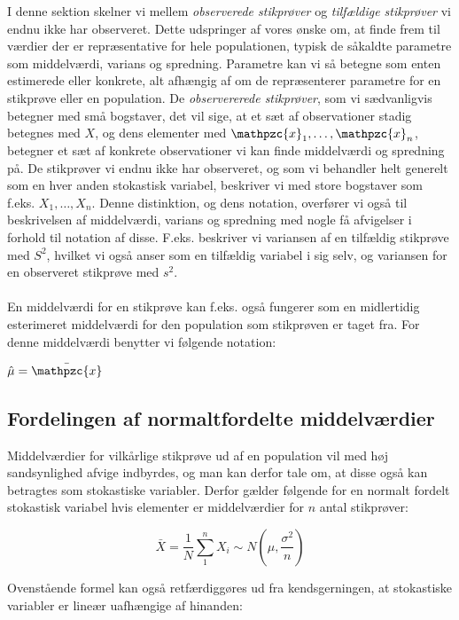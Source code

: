 \documentclass{article}
\newcommand{\mellemrum}{\vspace{2 ex}}
\newcommand{\cent}[1]{ \mellemrum \begin{center} #1\end{center} \mellemrum }
\newcommand{\centL}[1]{ \mellemrum \vspace{-20 px} \begin{center} $#1$\end{center} \mellemrum }
\newcommand{\parenthesis}[1]{\ensuremath{\left( #1 \right)}}
\newcommand{\script}[1]{\mathpzc{#1}}
\begin{document}
	I denne sektion skelner vi mellem \textit{observerede stikprøver} og \textit{tilfældige stikprøver} vi endnu ikke har observeret. Dette udspringer af vores ønske om, at finde frem til værdier der er repræsentative for hele populationen, typisk de såkaldte parametre som middelværdi, varians og spredning. Parametre kan vi så betegne som enten estimerede eller konkrete, alt afhængig af om de repræsenterer parametre for en stikprøve eller en population. De \textit{observererede stikprøver}, som vi sædvanligvis betegner med små bogstaver, det vil sige, at et sæt af observationer stadig betegnes med $X$, og dens elementer med $\script{x}_1,\dots, \script{x}_n$, betegner et sæt af konkrete observationer vi kan finde middelværdi og spredning på. De stikprøver vi endnu ikke har observeret, og som vi behandler helt generelt som en hver anden stokastisk variabel, beskriver vi med store bogstaver som f.eks. $X_1,\dots, X_n$. Denne distinktion, og dens notation, overfører vi også til beskrivelsen af middelværdi, varians og spredning med nogle få afvigelser i forhold til notation af disse. F.eks. beskriver vi variansen af en tilfældig stikprøve med $S^2$, hvilket vi også anser som en tilfældig variabel i sig selv, og variansen for en observeret stikprøve med $s^2$. \\\\
	
	En middelværdi for en stikprøve kan f.eks. også fungerer som en midlertidig esterimeret middelværdi for den population som stikprøven er taget fra. For denne middelværdi benytter vi følgende notation:
	
	\cent{$\hat{\mu} = \bar{\script{x}}$} 
	
	\subsection{Fordelingen af normaltfordelte middelværdier}
	
	Middelværdier for vilkårlige stikprøve ud af en population vil med høj sandsynlighed afvige indbyrdes, og man kan derfor tale om, at disse også kan betragtes som stokastiske variabler. Derfor gælder følgende for en normalt fordelt stokastisk variabel hvis elementer er middelværdier for $n$ antal stikprøver:
	
	
	\centL{$ \bar{X} = \frac{1}{N} \sum_{1}^{n}X_i \sim N\parenthesis{\mu,\frac{\sigma^2}{n}} $}
	
	Ovenstående formel kan også retfærdiggøres ud fra kendsgerningen, at stokastiske variabler er lineær uafhængige af hinanden:
	
\end{document}
